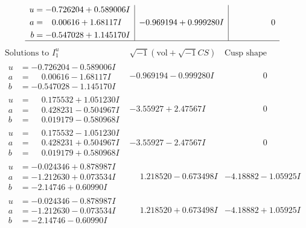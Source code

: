\documentclass[1p]{elsarticle_modified}
\theoremstyle{definition}
\newcommand{\I}{\sqrt{-1}}
\begin{document}
$$\begin{array}{c|c|c}
\begin{aligned}
u &= -0.726204 + 0.589006 I \\
a &= \phantom{-}0.00616 + 1.68117 I \\
b &= -0.547028 + 1.145170 I\end{aligned}
 & -0.969194 + 0.999280 I & \phantom{-0.000000 } 0\\
 \hline 
 \end{array}$$\newpage$$\begin{array}{c|c|c}  
\text{Solutions to }I^u_{1}& \I (\text{vol} + \sqrt{-1}CS) & \text{Cusp shape}\\
 \hline 
\begin{aligned}
u &= -0.726204 - 0.589006 I \\
a &= \phantom{-}0.00616 - 1.68117 I \\
b &= -0.547028 - 1.145170 I\end{aligned}
 & -0.969194 - 0.999280 I & \phantom{-0.000000 } 0 \\ \hline\begin{aligned}
u &= \phantom{-}0.175532 + 1.051230 I \\
a &= \phantom{-}0.428231 - 0.504967 I \\
b &= \phantom{-}0.019179 - 0.580968 I\end{aligned}
 & -3.55927 + 2.47567 I & \phantom{-0.000000 } 0 \\ \hline\begin{aligned}
u &= \phantom{-}0.175532 - 1.051230 I \\
a &= \phantom{-}0.428231 + 0.504967 I \\
b &= \phantom{-}0.019179 + 0.580968 I\end{aligned}
 & -3.55927 - 2.47567 I & \phantom{-0.000000 } 0 \\ \hline\begin{aligned}
u &= -0.024346 + 0.878987 I \\
a &= -1.212630 + 0.073534 I \\
b &= -2.14746 + 0.60990 I\end{aligned}
 & \phantom{-}1.218520 - 0.673498 I & -4.18882 - 1.05925 I \\ \hline\begin{aligned}
u &= -0.024346 - 0.878987 I \\
a &= -1.212630 - 0.073534 I \\
b &= -2.14746 - 0.60990 I\end{aligned}
 & \phantom{-}1.218520 + 0.673498 I & -4.18882 + 1.05925 I \\ \hline\begin{aligned}

\end{aligned}
\end{array}$$
\end{document}

